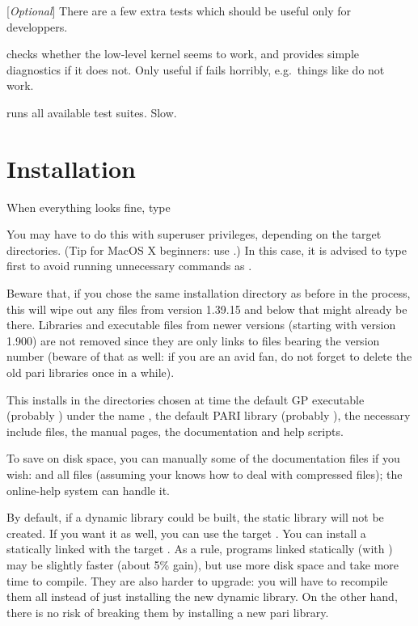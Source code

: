  [{\sl Optional\/}]
There are a few extra tests which should be useful only for developpers.

 checks whether the low-level kernel seems to work,
and provides simple diagnostics if it does not. Only useful if  fails horribly, e.g.~things like  do not work.

 runs all available test suites. Slow.

\section{Installation} When everything looks fine, type


\noindent You may have to do this with superuser privileges, depending on the
target directories. (Tip for MacOS X beginners: use .)
In this case, it is advised to type  first to avoid running
unnecessary commands as .

Beware that, if you chose the same installation directory as before in the
 process, this will wipe out any files from version 1.39.15
and below that might already be there. Libraries and executable files from
newer versions (starting with version 1.900) are not removed since they are
only links to files bearing the version number (beware of that as well: if
you are an avid  fan, do not forget to delete the old pari libraries
once in a while).

This installs in the directories chosen at  time the default
GP executable (probably ) under the name , the default
PARI library (probably ), the necessary include files, the
manual pages, the documentation and help scripts.

To save on disk space, you can manually  some of the documentation
files if you wish:  and all  files (assuming your
 knows how to deal with compressed files); the online-help system
can handle it.

By default, if a dynamic library  could be built, the static
library  will not be created. If you want it as well, you can
use the target . You can install a statically
linked  with the target . As a rule,
programs linked statically (with ) may be slightly faster
(about 5\% gain), but use more disk space and take more time to compile.
They are also harder to upgrade: you will have to recompile them all instead
of just installing the new dynamic library. On the other hand, there is no
risk of breaking them by installing a new pari library.


